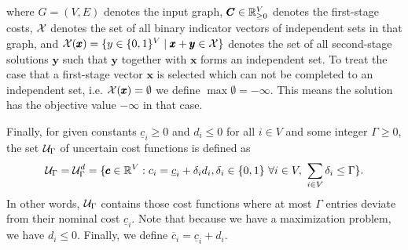 where $G = (V,E)$ denotes the input graph, $\pmb C \in \mathbb{R}_{\geq 0}^V$ denotes the first-stage costs, $\mathcal{X}$ denotes the set of all binary indicator vectors of independent sets in that graph, and $\mathcal{X}(\pmb x) = \{ y \in \{ 0,1 \}^V \mid \pmb x + \pmb y \in \mathcal{X} \}$ denotes the set of all second-stage solutions $\pmb y$ such that $\pmb y$ together with $\pmb x$ forms an independent set. To treat the case that a first-stage vector $\pmb x$ is selected which can not be completed to an independent set, i.e. $\mathcal{X}(\pmb x) = \emptyset$ we define $\max \emptyset = -\infty$. This means the solution has the objective value $-\infty$ in that case.

Finally, for given constants $\underline{c}_i \geq 0$ and $d_i \leq 0$ for all $i \in V$ and some integer $\Gamma \geq 0$, the set $\mathcal{U}_\Gamma$ of uncertain cost functions is defined as
\[
\mathcal{U}_\Gamma = \mathcal{U}_\Gamma^d = \{  \pmb c \in \mathbb{R}^V : c_i = \underline{c}_i + \delta_id_i, \delta_i \in \{ 0,1 \}\ \forall i \in V,\ \sum_{i \in V}\delta_i \leq \Gamma  \}.
\]
In other words, $\mathcal{U}_\Gamma$ contains those cost functions where at most $\Gamma$ entries deviate from their nominal cost $\underline{c}_i$. Note that because we have a maximization problem, we have $d_i \leq 0$. Finally, we define $\overline{c}_i = \underline{c}_i + d_i$.

